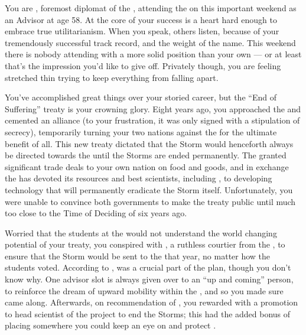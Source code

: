 \documentclass[char]{GL2020}
\begin{document}
\name{\cDiplomat{}}

You are \cDiplomat{\intro}, foremost diplomat of the \pTech{}, attending the \pSchool{} on this important weekend as an Advisor at age 58. At the core of your success is a heart hard enough to embrace true utilitarianism. When you speak, others listen, because of your tremendously successful track record, and the weight of the \cDiplomat{\formal} name. This weekend there is nobody attending with a more solid position than your own — or at least that's the impression you'd like to give off. Privately though, you are feeling stretched thin trying to keep everything from falling apart. 

You've accomplished great things over your storied career, but the “End of Suffering” treaty is your crowning glory. Eight years ago, you approached the \pFarm{} and cemented an alliance (to your frustration, it was only signed with a stipulation of secrecy), temporarily turning your two nations against the \pShip{} for the ultimate benefit of all. This new treaty dictated that the Storm would henceforth always be directed towards the \pShip{} until the Storms are ended permanently. The \pFarm{} granted significant trade deals to your own nation on food and goods, and in exchange the \pTech{} has devoted its resources and best scientists, including \cHeadScientist{\intro}, to developing technology that will permanently eradicate the Storm itself. Unfortunately, you were unable to convince both governments to make the treaty public until much too close to the Time of Deciding of six years ago.

Worried that the students at the \pSchool{} would not understand the world changing potential of your treaty, you conspired with \cEvil{\intro}, a ruthless courtier from the \pFarm{}, to ensure that the Storm would be sent to the \pShip{} that year, no matter how the students voted. According to \cEvil{}, \cHeadScientist{\full} was a crucial part of the plan, though you don’t know why. One advisor slot is always given over to an ``up and coming'' person, to reinforce the dream of upward mobility within the \pTech{}, and so you made sure \cHeadScientist{} came along. Afterwards, on recommendation of \cEvil{}, you rewarded \cHeadScientist{} with a promotion to head scientist of the project to end the Storms; this had the added bonus of placing \cHeadScientist{\them} somewhere you could keep an eye on and protect \cHeadScientist{\them}.
\end{document}
